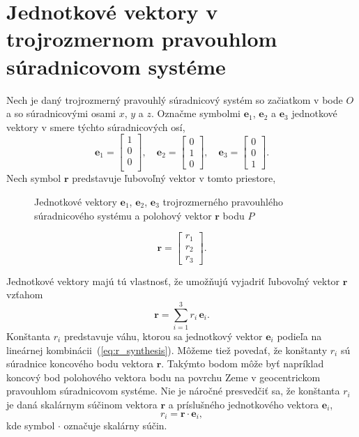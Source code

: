 \documentclass[a4paper, 12pt]{book}
\let\vec\mathbf
\begin{document}
\section{Jednotkové vektory v trojrozmernom pravouhlom súradnicovom systéme}
\label{sec:unit_vectors}

Nech je daný trojrozmerný pravouhlý súradnicový systém so začiatkom v bode $O$ 
a so súradnicovými osami $x$, $y$ a $z$.  Označme symbolmi $\vec e_1$, $\vec 
e_2$ a $\vec e_3$ jednotkové vektory v smere týchto súradnicových osí,
%
\begin{equation}
\vec e_1 =
\begin{bmatrix}
1\\
0\\
0\\
\end{bmatrix}
{,} \quad
%
\vec e_2 =
\begin{bmatrix}
0\\
1\\
0
\end{bmatrix}
%
{,}\quad
%
\vec e_3 =
\begin{bmatrix}
0\\
0\\
1
\end{bmatrix}
{.}
\end{equation}
%
Nech symbol $\vec r$ predstavuje ľubovoľný vektor v tomto priestore,

\begin{figure}
\centering

\caption{Jednotkové vektory $\vec e_1$, $\vec e_2$, $\vec e_3$ trojrozmerného 
pravouhlého súradnicového systému a polohový vektor $\vec r$ bodu $P$}
\label{fig:unit_vectors}
\end{figure}

\begin{equation}
\vec r =
\begin{bmatrix}
r_1\\
r_2\\
r_3
\end{bmatrix}
{.}
\end{equation}

Jednotkové vektory majú tú vlastnosť, že umožňujú vyjadriť ľubovoľný vektor 
$\vec r$ vzťahom
%
\begin{equation}
\label{eq:r_synthesis}
\vec r = \sum_{i = 1}^3 r_i \, \vec e_i{.}
\end{equation}
%
Konštanta $r_i$ predstavuje váhu, ktorou sa jednotkový vektor $\vec e_i$ 
podieľa na lineárnej kombinácii~(\ref{eq:r_synthesis}).  Môžeme tiež povedať, 
že konštanty $r_i$ sú súradnice koncového bodu vektora $\vec r$.  Takýmto bodom 
môže byť napríklad koncový bod polohového vektora bodu na povrchu Zeme 
v geocentrickom pravouhlom súradnicovom systéme.  Nie je náročné presvedčiť sa, 
že konštanta $r_i$ je daná skalárnym súčinom vektora $\vec r$ a príslušného 
jednotkového vektora $\vec e_i$,
%
\begin{equation}
\label{eq:r_analysis}
r_i = \vec r \cdot \vec e_i{,}
\end{equation}
%
kde symbol $\cdot$ označuje skalárny súčin.
\end{document}
